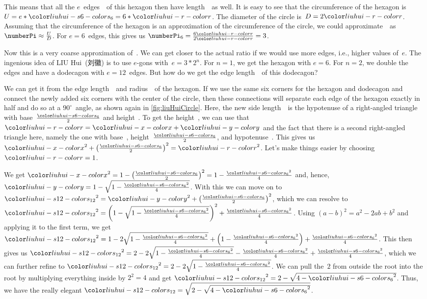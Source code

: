 This means that all the $e$~edges~\liuhuiss\ of this hexagon then have length~\liuhuir\ as well.
It is easy to see that the circumference of the hexagon is~$U=e*\liuhuiss=6*\liuhuir$.
The diameter of the circle is~$D=2\liuhuir$.
Assuming that the circumference of the hexagon is an approximation of the circumference of the circle, we could approximate~\numberPi\ as $\numberPi\approx\frac{U}{D}$.
For $e=6$~edges, this gives us $\numberPi_6=\frac{6\liuhuir}{2\liuhuir}=3$.

Now this is a very coarse approximation of~\numberPi.
We can get closer to the actual ratio if we would use more edges, i.e., higher values of~$e$.
The ingenious idea of LIU Hui~(刘徽) is to use $e$\nobreakdashes-gons with~$e=3*2^n$.
For $n=1$, we get the hexagon with $e=6$.
For $n=2$, we double the edges and have a dodecagon with $e=12$~edges.
But how do we get the edge length~\liuhuist\ of this dodecagon?

We can get it from the edge length~\liuhuiss\ and radius~\liuhuir\ of the hexagon.
If we use the same six corners for the hexagon and dodecagon and connect the newly added six corners with the center of the circle, then these connections will separate each edge of the hexagon exactly in half and do so at a $90^\circ$~angle, as shown again in \cref{fig:liuHuiCircle}.
Here, the new side length~\liuhuist\ is the hypotenuse of a right-angled triangle with base~$\frac{\liuhuiss}{2}$ and height~\liuhuiy.
To get the height~\liuhuiy, we can use that~$\liuhuir=\liuhuix+\liuhuiy$ and the fact that there is a second right-angled triangle here, namely the one with base~\liuhuix, height~$\frac{\liuhuiss}{2}$, and hypotenuse~\liuhuir.
This gives us $\liuhuix^2+\left(\frac{\liuhuiss}{2}\right)^2=\liuhuir^2$.
Let's make things easier by choosing~$\liuhuir=1$.

We get $\liuhuix^2=1-\left(\frac{\liuhuiss}{2}\right)^2=1-\frac{\liuhuiss^2}{4}$ and, hence, $\liuhuiy=1-\sqrt{1-\frac{\liuhuiss^2}{4}}$.
With this we can move on to $\liuhuist^2=\liuhuiy^2+\left(\frac{\liuhuiss}{2}\right)^2$, which we can resolve to $\liuhuist^2=\left(1-\sqrt{1-\frac{\liuhuiss^2}{4}}\right)^2+\frac{\liuhuiss^2}{4}$.
Using $(a-b)^2=a^2-2ab+b^2$ and applying it to the first term, we get $\liuhuist^2=1-2\sqrt{1-\frac{\liuhuiss^2}{4}}+\left(1-\frac{\liuhuiss^2}{4}\right)+\frac{\liuhuiss^2}{4}$.
This then gives us $\liuhuist^2=2-2\sqrt{1-\frac{\liuhuiss^2}{4}}-\frac{\liuhuiss^2}{4}+\frac{\liuhuiss^2}{4}$, which we can further refine to $\liuhuist^2=2-2\sqrt{1-\frac{\liuhuiss^2}{4}}$.
We can pull the~$2$ from outside the root into the root by multiplying everything inside by $2^2=4$ and get $\liuhuist^2=2-\sqrt{4-\liuhuiss^2}$.
Thus, we have the really elegant $\liuhuist=\sqrt{2-\sqrt{4-\liuhuiss^2}}$.

